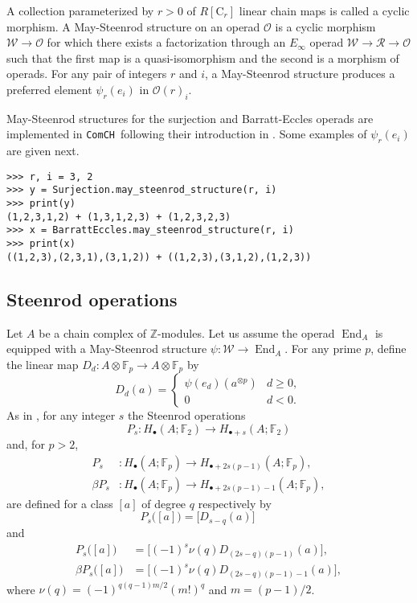 \documentclass{amsart}
\newcommand{\C}{\mathrm{C}}
\newcommand{\comch}{\texttt{ComCH}}
\DeclareMathOperator{\End}{End}
\begin{document}
A collection parameterized by $r > 0$ of $R[\C_r]$ linear chain maps is called a cyclic morphism.
A May-Steenrod structure on an operad $\mathcal O$ is a cyclic morphism $\mathcal W \to \mathcal O$ for which there exists a factorization through an $E_\infty$ operad $\mathcal W \to \mathcal R \to \mathcal O$ such that the first map is a quasi-isomorphism and the second is a morphism of operads.
For any pair of integers $r$ and $i$, a May-Steenrod structure produces a preferred element $\psi_r(e_i)$ in $\mathcal O(r)_i$.

May-Steenrod structures for the surjection and Barratt-Eccles operads are implemented in \comch\, following their introduction in \cite{medina2021maysteenrod}.
Some examples of $\psi_r(e_i)$ are given next.

\begin{Verbatim}[frame=lines, samepage=true]
>>> r, i = 3, 2
>>> y = Surjection.may_steenrod_structure(r, i)
>>> print(y)
(1,2,3,1,2) + (1,3,1,2,3) + (1,2,3,2,3)
>>> x = BarrattEccles.may_steenrod_structure(r, i)
>>> print(x)
((1,2,3),(2,3,1),(3,1,2)) + ((1,2,3),(3,1,2),(1,2,3))
\end{Verbatim}

\subsection{Steenrod operations}

Let $A$ be a chain complex of $\mathbb Z$-modules.
Let us assume the operad $\End_A$ is equipped with a May-Steenrod structure $\psi \colon \mathcal W \to \End_A$.
For any prime $p$, define the linear map $D_d \colon A \otimes \mathbb F_p \to A \otimes \mathbb F_p$ by
\begin{equation*}
D_d(a) = \begin{cases}
\psi(e_d)(a^{\otimes p}) & d \geq 0, \\
0 & d < 0.
\end{cases}
\end{equation*}
As in \cite{May70algebraic}, for any integer $s$ the Steenrod operations
\begin{equation*}
P_s : H_\bullet(A; \mathbb F_2) \to H_{\bullet + s}(A; \mathbb F_2)
\end{equation*}
and, for $p > 2$,
\begin{align*}
P_s & \colon H_\bullet(A; \mathbb F_p) \to H_{\bullet + 2s(p-1)}(A; \mathbb F_p), \\
\beta P_s & \colon H_\bullet(A; \mathbb F_p) \to H_{\bullet + 2s(p-1) - 1}(A; \mathbb F_p),
\end{align*}
are defined for a class $[a]$ of degree $q$ respectively by
\begin{equation*}
P_s\big([a]\big) = \big[D_{s-q}(a)\big] \qquad
\end{equation*}
and
\begin{align*}
P_s\big([a]\big) & = \big[(-1)^s \nu(q) D_{(2s-q)(p-1)}(a)\big], \\
\beta P_s\big([a]\big) & = \big[(-1)^s \nu(q)D_{(2s-q)(p-1)-1}(a)\big],
\end{align*}
where $\nu(q) = (-1)^{q(q-1)m/2}(m!)^q$ and $m = (p-1)/2$.
\end{document}
